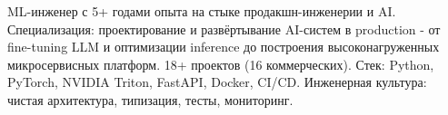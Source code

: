 \documentclass[]{deedy-resume-reversed}
\begin{document}




{\fontsize{9.5pt}{12pt}\selectfont ML-инженер с 5+ годами опыта на стыке продакшн-инженерии и AI. Специализация: проектирование и развёртывание AI-систем в production - от fine-tuning LLM и оптимизации inference до построения высоконагруженных микросервисных платформ. 18+ проектов (16 коммерческих). Стек: Python, PyTorch, NVIDIA Triton, FastAPI, Docker, CI/CD. Инженерная культура: чистая архитектура, типизация, тесты, мониторинг.}

\vspace{4pt}
\noindent\makebox[\linewidth]{\color{accent}\rule{\linewidth}{0.6pt}}
\vspace{2pt}

\end{document}
